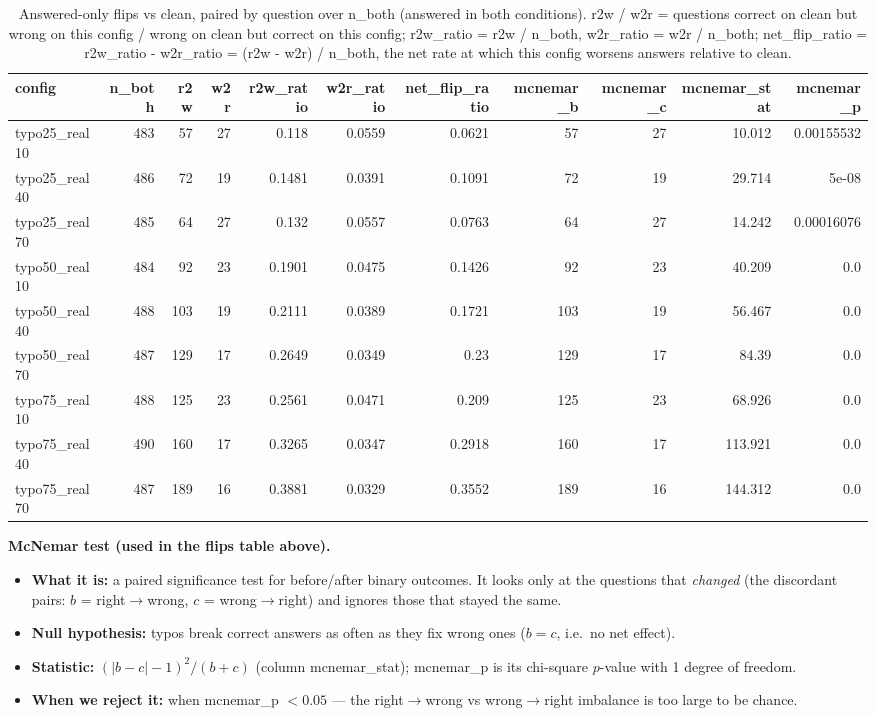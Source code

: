 \documentclass[11pt]{article}
\begin{document}
\begin{table}[H]
\centering
\caption{Answered-only flips vs clean, paired by question over n\_both (answered in both conditions). r2w / w2r = questions correct on clean but wrong on this config / wrong on clean but correct on this config; r2w\_ratio = r2w / n\_both, w2r\_ratio = w2r / n\_both; net\_flip\_ratio = r2w\_ratio - w2r\_ratio = (r2w - w2r) / n\_both, the net rate at which this config worsens answers relative to clean.}
\small
\begin{adjustbox}{max width=\textwidth}
\begin{tabular}{lrrrrrrrrrr}
\toprule
\textbf{config} & \textbf{n\_both} & \textbf{r2w} & \textbf{w2r} & \textbf{r2w\_ratio} & \textbf{w2r\_ratio} & \textbf{net\_flip\_ratio} & \textbf{mcnemar\_b} & \textbf{mcnemar\_c} & \textbf{mcnemar\_stat} & \textbf{mcnemar\_p} \\
\midrule
typo25\_real10 & 483 & 57 & 27 & 0.118 & 0.0559 & 0.0621 & 57 & 27 & 10.012 & 0.00155532 \\
typo25\_real40 & 486 & 72 & 19 & 0.1481 & 0.0391 & 0.1091 & 72 & 19 & 29.714 & 5e-08 \\
typo25\_real70 & 485 & 64 & 27 & 0.132 & 0.0557 & 0.0763 & 64 & 27 & 14.242 & 0.00016076 \\
typo50\_real10 & 484 & 92 & 23 & 0.1901 & 0.0475 & 0.1426 & 92 & 23 & 40.209 & 0.0 \\
typo50\_real40 & 488 & 103 & 19 & 0.2111 & 0.0389 & 0.1721 & 103 & 19 & 56.467 & 0.0 \\
typo50\_real70 & 487 & 129 & 17 & 0.2649 & 0.0349 & 0.23 & 129 & 17 & 84.39 & 0.0 \\
typo75\_real10 & 488 & 125 & 23 & 0.2561 & 0.0471 & 0.209 & 125 & 23 & 68.926 & 0.0 \\
typo75\_real40 & 490 & 160 & 17 & 0.3265 & 0.0347 & 0.2918 & 160 & 17 & 113.921 & 0.0 \\
typo75\_real70 & 487 & 189 & 16 & 0.3881 & 0.0329 & 0.3552 & 189 & 16 & 144.312 & 0.0 \\
\bottomrule
\end{tabular}
\end{adjustbox}
\end{table}

\medskip
\noindent\textbf{McNemar test (used in the flips table above).}
\begin{itemize}\setlength{\itemsep}{1pt}
  \item \textbf{What it is:} a paired significance test for before/after binary
  outcomes. It looks only at the questions that \emph{changed} (the discordant pairs:
  $b$ = right$\to$wrong, $c$ = wrong$\to$right) and ignores those that stayed the same.
  \item \textbf{Null hypothesis:} typos break correct answers as often as they fix
  wrong ones ($b = c$, i.e.\ no net effect).
  \item \textbf{Statistic:} $(|b - c| - 1)^2 / (b + c)$ (column mcnemar\_stat);
  mcnemar\_p is its chi-square $p$-value with 1 degree of freedom.
  \item \textbf{When we reject it:} when mcnemar\_p $< 0.05$ --- the
  right$\to$wrong vs wrong$\to$right imbalance is too large to be chance.
\end{itemize}
\end{document}
